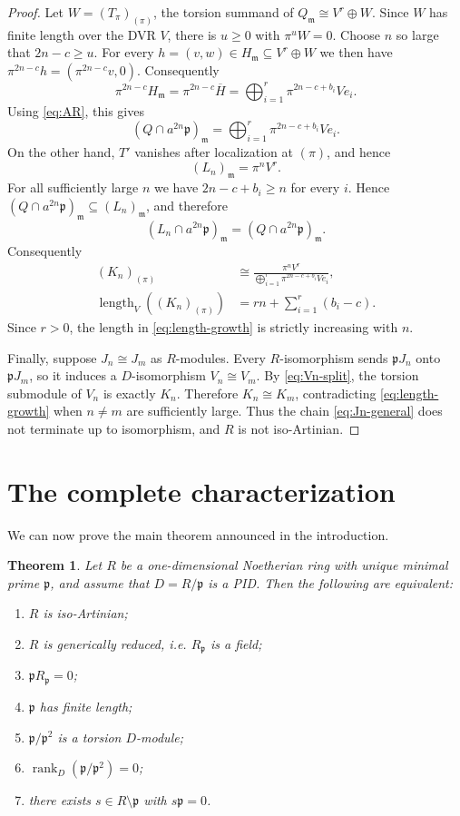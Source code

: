 \documentclass[11pt]{article}
\newtheorem{theorem}{Theorem}[section]
\theoremstyle{definition}
\newcommand{\rank}{\operatorname{rank}}
\newcommand{\len}{\operatorname{length}}
\begin{document}
\begin{proof}
Let $W=(T_\pi)_{(\pi)}$, the torsion summand of
$Q_{\mathfrak m}\cong V^r\oplus W$.  Since $W$ has finite length over the DVR $V$,
there is $u\ge 0$ with $\pi^uW=0$.  Choose $n$ so large that $2n-c\ge u$.
For every $h=(v,w)\in H_{\mathfrak m}\subseteq V^r\oplus W$ we then have
$\pi^{2n-c}h=(\pi^{2n-c}v,0)$.  Consequently
\[
 \pi^{2n-c}H_{\mathfrak m}=\pi^{2n-c}\overline H
 =\bigoplus_{i=1}^r\pi^{2n-c+b_i}Ve_i.
\]
Using \eqref{eq:AR}, this gives
\[
 (Q\cap a^{2n}\mathfrak p)_{\mathfrak m}
 =\bigoplus_{i=1}^r\pi^{2n-c+b_i}Ve_i.
\]
On the other hand, $T'$ vanishes after localization at $(\pi)$, and hence
\[
 (L_n)_{\mathfrak m}=\pi^nV^r.
\]
For all sufficiently large $n$ we have $2n-c+b_i\ge n$ for every $i$.  Hence
$(Q\cap a^{2n}\mathfrak p)_{\mathfrak m}\subseteq(L_n)_{\mathfrak m}$, and therefore
\[
 (L_n\cap a^{2n}\mathfrak p)_{\mathfrak m}
 =(Q\cap a^{2n}\mathfrak p)_{\mathfrak m}.
\]
Consequently
\begin{align}
 (K_n)_{(\pi)}
 &\cong
 \frac{\pi^nV^r}
 {\bigoplus_{i=1}^r\pi^{2n-c+b_i}Ve_i},\label{eq:Kn-local}\\
 \len_V((K_n)_{(\pi)})
 &=rn+\sum_{i=1}^r(b_i-c).\label{eq:length-growth}
\end{align}
Since $r>0$, the length in \eqref{eq:length-growth} is strictly increasing with $n$.

Finally, suppose $J_n\cong J_m$ as $R$-modules.  Every $R$-isomorphism sends
$\mathfrak pJ_n$ onto $\mathfrak pJ_m$, so it induces a $D$-isomorphism
$V_n\cong V_m$.  By \eqref{eq:Vn-split}, the torsion submodule of $V_n$ is exactly $K_n$.
Therefore $K_n\cong K_m$, contradicting \eqref{eq:length-growth} when $n\ne m$ are
sufficiently large.  Thus the chain \eqref{eq:Jn-general} does not terminate up to isomorphism,
and $R$ is not iso-Artinian.
\end{proof}

\section{The complete characterization}

We can now prove the main theorem announced in the introduction.

\begin{theorem}\label{thm:complete}
Let $R$ be a one-dimensional Noetherian ring with unique minimal prime $\mathfrak p$, and
assume that $D=R/\mathfrak p$ is a PID.  Then the following are equivalent:
\begin{enumerate}[label=\textup{(\roman*)}]
\item $R$ is iso-Artinian;
\item $R$ is generically reduced, i.e. $R_{\mathfrak p}$ is a field;
\item $\mathfrak pR_{\mathfrak p}=0$;
\item $\mathfrak p$ has finite length;
\item $\mathfrak p/\mathfrak p^2$ is a torsion $D$-module;
\item $\rank_D(\mathfrak p/\mathfrak p^2)=0$;
\item there exists $s\in R\setminus\mathfrak p$ with $s\mathfrak p=0$.
\end{enumerate}
\end{theorem}
\end{document}

